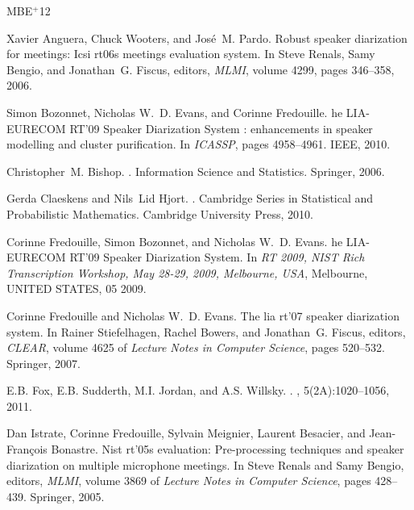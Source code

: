 \newcommand{\etalchar}[1]{$^{#1}$}
\begin{thebibliography}{MBE{\etalchar{+}}12}

Xavier Anguera, Chuck Wooters, and José~M. Pardo.
\newblock Robust speaker diarization for meetings: Icsi rt06s meetings
  evaluation system.
\newblock In Steve Renals, Samy Bengio, and Jonathan~G. Fiscus, editors, {\em
  MLMI}, volume 4299, pages 346--358, 2006.

Simon Bozonnet, Nicholas W.~D. Evans, and Corinne Fredouille.
he {LIA}-{EURECOM} {RT}'09 {S}peaker {D}iarization {S}ystem :
  enhancements in speaker modelling and cluster purification.
\newblock In {\em ICASSP}, pages 4958--4961. IEEE, 2010.

Christopher~M. Bishop.
.
\newblock Information Science and Statistics. Springer, 2006.

Gerda Claeskens and Nils~Lid Hjort.
.
\newblock Cambridge Series in Statistical and Probabilistic Mathematics.
  Cambridge University Press, 2010.

Corinne Fredouille, Simon Bozonnet, and Nicholas W.~D. Evans.
he {LIA}-{EURECOM} {RT}'09 {S}peaker {D}iarization {S}ystem.
\newblock In {\em {RT} 2009, {NIST} {R}ich {T}ranscription {W}orkshop, {M}ay
  28-29, 2009, {M}elbourne, {USA}}, {M}elbourne, {UNITED} {STATES}, 05 2009.

Corinne Fredouille and Nicholas W.~D. Evans.
\newblock The lia rt'07 speaker diarization system.
\newblock In Rainer Stiefelhagen, Rachel Bowers, and Jonathan~G. Fiscus,
  editors, {\em CLEAR}, volume 4625 of {\em Lecture Notes in Computer Science},
  pages 520--532. Springer, 2007.

E.B. Fox, E.B. Sudderth, M.I. Jordan, and A.S. Willsky.
.
, 5(2A):1020--1056, 2011.

\bibitem[IFM{\etalchar{+}}05]{Istrate2005}
Dan Istrate, Corinne Fredouille, Sylvain Meignier, Laurent Besacier, and
  Jean-François Bonastre.
\newblock Nist rt'05s evaluation: Pre-processing techniques and speaker
  diarization on multiple microphone meetings.
\newblock In Steve Renals and Samy Bengio, editors, {\em MLMI}, volume 3869 of
  {\em Lecture Notes in Computer Science}, pages 428--439. Springer, 2005.


\end{thebibliography}

